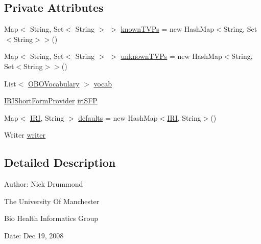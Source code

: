 \subsection*{Private Attributes}
\begin{DoxyCompactItemize}
\item 
Map$<$ String, Set$<$ String $>$ $>$ \hyperlink{classorg_1_1coode_1_1owlapi_1_1obo_1_1renderer_1_1_o_b_o_tag_value_pair_list_a84d0378e2f2e251d050638567b6dd08f}{known\-T\-V\-Ps} = new Hash\-Map$<$String, Set$<$String$>$$>$()
\item 
Map$<$ String, Set$<$ String $>$ $>$ \hyperlink{classorg_1_1coode_1_1owlapi_1_1obo_1_1renderer_1_1_o_b_o_tag_value_pair_list_a8a0693c46b7ddd42a9c2c320195e9df4}{unknown\-T\-V\-Ps} = new Hash\-Map$<$String, Set$<$String$>$$>$()
\item 
List$<$ \hyperlink{enumorg_1_1coode_1_1owlapi_1_1obo_1_1parser_1_1_o_b_o_vocabulary}{O\-B\-O\-Vocabulary} $>$ \hyperlink{classorg_1_1coode_1_1owlapi_1_1obo_1_1renderer_1_1_o_b_o_tag_value_pair_list_a3392ddecca64f919cde36c0a9d385fc3}{vocab}
\item 
\hyperlink{interfaceorg_1_1semanticweb_1_1owlapi_1_1util_1_1_i_r_i_short_form_provider}{I\-R\-I\-Short\-Form\-Provider} \hyperlink{classorg_1_1coode_1_1owlapi_1_1obo_1_1renderer_1_1_o_b_o_tag_value_pair_list_a8b13b099717a4321466a7365704b9e9a}{iri\-S\-F\-P}
\item 
Map$<$ \hyperlink{classorg_1_1semanticweb_1_1owlapi_1_1model_1_1_i_r_i}{I\-R\-I}, String $>$ \hyperlink{classorg_1_1coode_1_1owlapi_1_1obo_1_1renderer_1_1_o_b_o_tag_value_pair_list_aec11c65cd5905aa821619468a3ec1322}{defaults} = new Hash\-Map$<$\hyperlink{classorg_1_1semanticweb_1_1owlapi_1_1model_1_1_i_r_i}{I\-R\-I}, String$>$()
\item 
Writer \hyperlink{classorg_1_1coode_1_1owlapi_1_1obo_1_1renderer_1_1_o_b_o_tag_value_pair_list_ad0a3b1f6b26443723d93319b93c5a904}{writer}
\end{DoxyCompactItemize}


\subsection{Detailed Description}
Author\-: Nick Drummond\par
 The University Of Manchester\par
 Bio Health Informatics Group\par
 Date\-: Dec 19, 2008\par
\par
 

